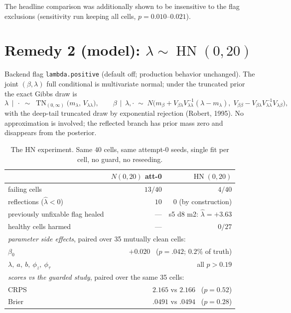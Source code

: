 \documentclass[11pt]{article}
\newcommand{\code}[1]{\texttt{#1}}
\DeclareMathOperator{\hn}{HN}
\DeclareMathOperator{\TN}{TN}
\begin{document}
The headline comparison was additionally shown to be insensitive to the
flag exclusions (sensitivity run keeping all cells,
$p = 0.010$--$0.021$).

\section{Remedy 2 (model): $\lambda \sim \hn(0, 20)$}

Backend flag \code{lambda.positive} (default off; production behavior
unchanged). The joint $(\beta, \lambda)$ full conditional is multivariate
normal; under the truncated prior the exact Gibbs draw is
\begin{equation}
  \lambda \,\mid\, \cdot \;\sim\; \TN_{(0,\infty)}\!\big(m_\lambda,\, V_{\lambda\lambda}\big),
  \qquad
  \beta \,\mid\, \lambda, \cdot \;\sim\;
  N\!\big(m_\beta + V_{\beta\lambda} V_{\lambda\lambda}^{-1}(\lambda - m_\lambda),\;
        V_{\beta\beta} - V_{\beta\lambda} V_{\lambda\lambda}^{-1} V_{\lambda\beta}\big),
  \label{eq:tgibbs}
\end{equation}
with the deep-tail truncated draw by exponential rejection (Robert,
1995). No approximation is involved; the reflected branch has prior mass
zero and disappears from the posterior.

\begin{table}[ht]
\centering
\caption{The HN experiment. Same $40$ cells, same attempt-0 seeds,
single fit per cell, no guard, no reseeding.}
\label{tab:hn}
\begin{tabular}{lrr}
\toprule
 & $N(0,20)$ att-0 & $\hn(0,20)$ \\
\midrule
failing cells                    & $13/40$ & $4/40$ \\
reflections ($\hat\lambda < 0$)  & $10$    & $0$ (by construction) \\
previously unfixable flag healed & --- & s5 d8 m2: $\hat\lambda = +3.63$ \\
healthy cells harmed             & --- & $0/27$ \\
\midrule
\multicolumn{3}{l}{\emph{parameter side effects}, paired over 35 mutually clean cells:} \\
$\beta_0$   & \multicolumn{2}{r}{$+0.020$ \ ($p=.042$; $0.2\%$ of truth)} \\
$\lambda,\ a,\ b,\ \phi_z,\ \phi_\tau$ & \multicolumn{2}{r}{all $p > 0.19$} \\
\midrule
\multicolumn{3}{l}{\emph{scores vs the guarded study}, paired over the same 35 cells:} \\
CRPS  & \multicolumn{2}{r}{$2.165$ vs $2.166$ \ ($p = 0.52$)} \\
Brier & \multicolumn{2}{r}{$.0491$ vs $.0494$ \ ($p = 0.28$)} \\
\bottomrule
\end{tabular}
\end{table}
\end{document}
